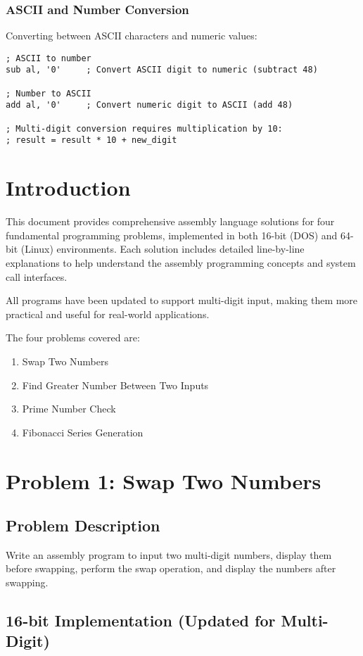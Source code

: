 \documentclass[12pt,a4paper]{article}
\begin{document}
\subsubsection{ASCII and Number Conversion}
Converting between ASCII characters and numeric values:
\begin{lstlisting}
; ASCII to number
sub al, '0'     ; Convert ASCII digit to numeric (subtract 48)

; Number to ASCII
add al, '0'     ; Convert numeric digit to ASCII (add 48)

; Multi-digit conversion requires multiplication by 10:
; result = result * 10 + new_digit
\end{lstlisting}

\section{Introduction}

This document provides comprehensive assembly language solutions for four fundamental programming problems, implemented in both 16-bit (DOS) and 64-bit (Linux) environments. Each solution includes detailed line-by-line explanations to help understand the assembly programming concepts and system call interfaces.

All programs have been updated to support multi-digit input, making them more practical and useful for real-world applications.

The four problems covered are:
\begin{enumerate}
\item Swap Two Numbers
\item Find Greater Number Between Two Inputs
\item Prime Number Check
\item Fibonacci Series Generation
\end{enumerate}

\section{Problem 1: Swap Two Numbers}

\subsection{Problem Description}
Write an assembly program to input two multi-digit numbers, display them before swapping, perform the swap operation, and display the numbers after swapping.

\subsection{16-bit Implementation (Updated for Multi-Digit)}
\end{document}
